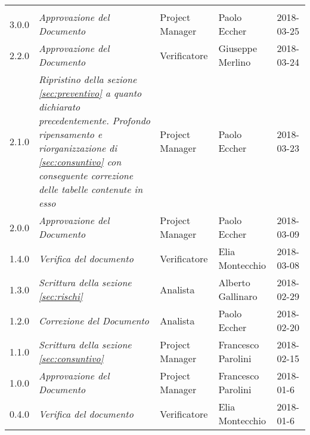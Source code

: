 \newpage 
\section*{}
\begin{table}[H]
	\centering
	\begin{tabular}{C{2cm}|C{4cm}|C{3cm}|C{3cm}|R{2cm}}
		
		 & & & &  \\
		
		3.0.0 &\emph{Approvazione del Documento} & Project Manager & Paolo Eccher & 2018-03-25 \\
		\hline
		
		2.2.0 &\emph{Approvazione del Documento} & Verificatore & Giuseppe Merlino & 2018-03-24 \\
		\hline
		
		2.1.0 &\emph{Ripristino della sezione \ref{sec:preventivo} a quanto dichiarato precedentemente. Profondo ripensamento e riorganizzazione di \ref{sec:consuntivo} con conseguente correzione delle tabelle contenute in esso} & Project Manager & Paolo Eccher & 2018-03-23 \\
		\hline
		
		2.0.0 &\emph{Approvazione del Documento} & Project Manager & Paolo Eccher & 2018-03-09 \\
		\hline
		
		1.4.0 &\emph{Verifica del documento} & Verificatore & Elia Montecchio & 2018-03-08 \\
		\hline
		
		1.3.0 &\emph{Scrittura della sezione \ref{sec:rischi}} & Analista & Alberto Gallinaro & 2018-02-29 \\
		\hline

		1.2.0 &\emph{Correzione del Documento} & Analista & Paolo Eccher & 2018-02-20 \\
		\hline
		
		1.1.0 &\emph{Scrittura della sezione \ref{sec:consuntivo}} & Project Manager & Francesco Parolini & 2018-02-15 \\
		\hline
		
		1.0.0 &\emph{Approvazione del Documento} & Project Manager & Francesco Parolini & 2018-01-6 \\
		\hline
		
		0.4.0 &\emph{Verifica del documento} & Verificatore & Elia Montecchio & 2018-01-6 \\
		\hline
		

\end{tabular}
\end{table}
